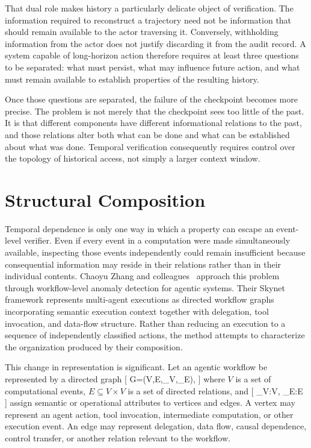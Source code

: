 \documentclass[11pt]{article}
\begin{document}
That dual role makes history a particularly delicate object of verification. The information required to reconstruct a trajectory need not be information that should remain available to the actor traversing it. Conversely, withholding information from the actor does not justify discarding it from the audit record. A system capable of long-horizon action therefore requires at least three questions to be separated: what must persist, what may influence future action, and what must remain available to establish properties of the resulting history.

Once those questions are separated, the failure of the checkpoint becomes more precise. The problem is not merely that the checkpoint sees too little of the past. It is that different components have different informational relations to the past, and those relations alter both what can be done and what can be established about what was done. Temporal verification consequently requires control over the topology of historical access, not simply a larger context window.

\section{Structural Composition}

Temporal dependence is only one way in which a property can escape an event-level verifier. Even if every event in a computation were made simultaneously available, inspecting those events independently could remain insufficient because consequential information may reside in their relations rather than in their individual contents. Chaoyu Zhang and colleagues~\cite{zhang2026} approach this problem through workflow-level anomaly detection for agentic systems. Their Skynet framework represents multi-agent executions as directed workflow graphs incorporating semantic execution context together with delegation, tool invocation, and data-flow structure. Rather than reducing an execution to a sequence of independently classified actions, the method attempts to characterize the organization produced by their composition.

This change in representation is significant. Let an agentic workflow be represented by a directed graph
[
G=(V,E,\lambda_V,\lambda_E),
]
where $V$ is a set of computational events, $E\subseteq V\times V$ is a set of directed relations, and
[
\lambda_V:V\rightarrow{},
\qquad
\lambda_E:E\rightarrow{}
]
assign semantic or operational attributes to vertices and edges. A vertex may represent an agent action, tool invocation, intermediate computation, or other execution event. An edge may represent delegation, data flow, causal dependence, control transfer, or another relation relevant to the workflow.
\end{document}
